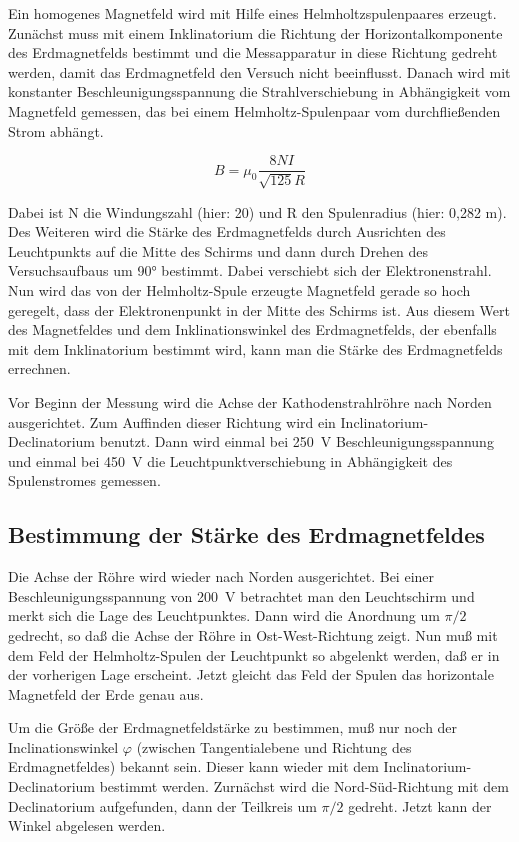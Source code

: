 Ein homogenes Magnetfeld wird mit Hilfe eines Helmholtzspulenpaares erzeugt. Zunächst muss
mit einem Inklinatorium die Richtung der Horizontalkomponente des Erdmagnetfelds bestimmt und die
Messapparatur in diese Richtung gedreht werden, damit das Erdmagnetfeld den Versuch nicht beeinflusst.
Danach wird mit konstanter Beschleunigungsspannung die Strahlverschiebung in Abhängigkeit vom Magnetfeld gemessen, das bei einem Helmholtz-Spulenpaar vom durchfließenden Strom abhängt.

\begin{equation}
\label{eq:Theorie_Magnetfeld}
B = \mu_0\frac{8 N I}{\sqrt{125}R}
\end{equation}

Dabei ist N die Windungszahl (hier: 20) und R den Spulenradius (hier: 0,282 m).
Des Weiteren wird die Stärke des Erdmagnetfelds durch Ausrichten des Leuchtpunkts auf die Mitte des Schirms und dann durch Drehen des Versuchsaufbaus um 90° bestimmt. Dabei verschiebt sich der Elektronenstrahl. Nun wird das von der Helmholtz-Spule erzeugte Magnetfeld
gerade so hoch geregelt, dass der Elektronenpunkt in der Mitte des Schirms ist. Aus diesem Wert des Magnetfeldes und dem Inklinationswinkel des Erdmagnetfelds, der ebenfalls mit dem Inklinatorium bestimmt wird, kann man die Stärke des Erdmagnetfelds errechnen.

Vor Beginn der Messung wird die Achse der Kathodenstrahlröhre nach
Norden ausgerichtet. Zum Auffinden dieser Richtung wird ein
Inclinatorium-Declinatorium benutzt. Dann wird einmal bei
\SI{250}{\volt} Beschleunigungsspannung und einmal bei \SI{450}{\volt}
die Leuchtpunktverschiebung in Abhängigkeit des Spulenstromes gemessen.

\subsection{Bestimmung der Stärke des Erdmagnetfeldes}

Die Achse der Röhre wird wieder nach Norden ausgerichtet. Bei einer
Beschleunigungsspannung von \SI{200}{\volt} betrachtet man den
Leuchtschirm und merkt sich die Lage des Leuchtpunktes. Dann wird die
Anordnung um $\pi/2$ gedrecht, so daß die Achse der Röhre in
Ost-West-Richtung zeigt. Nun muß mit dem Feld der
Helmholtz-Spulen der Leuchtpunkt so abgelenkt werden, daß er in
der vorherigen Lage erscheint. Jetzt gleicht das Feld der Spulen das
horizontale Magnetfeld der Erde genau aus.

Um die Größe der Erdmagnetfeldstärke zu bestimmen, muß nur noch der
Inclinationswinkel $\varphi$ (zwischen Tangentialebene und Richtung des
Erdmagnetfeldes) bekannt sein. Dieser kann wieder mit dem
Inclinatorium-Declinatorium bestimmt werden. Zurnächst wird die
Nord-Süd-Richtung mit dem Declinatorium aufgefunden, dann der Teilkreis
um $\pi/2$ gedreht. Jetzt kann der Winkel abgelesen werden.

